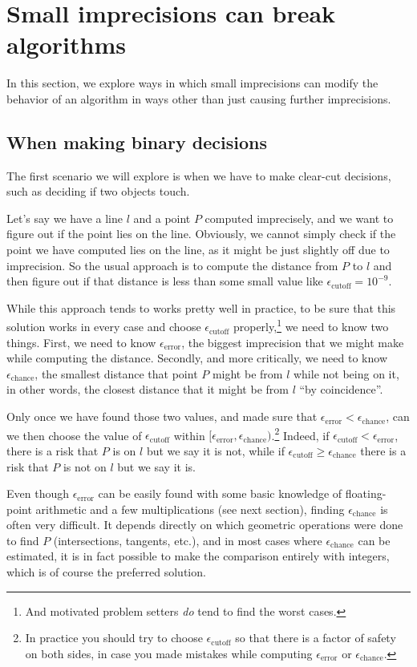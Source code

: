 \section{Small imprecisions can break algorithms}
In this section, we explore ways in which small imprecisions can modify the behavior of an algorithm in ways other than just causing further imprecisions.

\subsection{When making binary decisions}
The first scenario we will explore is when we have to make clear-cut decisions, such as deciding if two objects touch.

{
    \newcommand{\eCutoff}{\epsilon_{\mathrm{cutoff}}}
    \newcommand{\eError}{\epsilon_{\mathrm{error}}}
    \newcommand{\eChance}{\epsilon_{\mathrm{chance}}}
    Let's say we have a line $l$ and a point $P$ computed imprecisely, and we want to figure out if the point lies on the line. Obviously, we cannot simply check if the point we have computed lies on the line, as it might be just slightly off due to imprecision. So the usual approach is to compute the distance from $P$ to $l$ and then figure out if that distance is less than some small value like $\eCutoff=10^{-9}$.

    While this approach tends to works pretty well in practice, to be sure that this solution works in every case and choose $\eCutoff$ properly,\footnote{And motivated problem setters \emph{do} tend to find the worst cases.} we need to know two things. First, we need to know $\eError$, the biggest imprecision that we might make while computing the distance. Secondly, and more critically, we need to know $\eChance$, the smallest distance that point $P$ might be from $l$ while not being on it, in other words, the closest distance that it might be from $l$ ``by coincidence''.

    Only once we have found those two values, and made sure that $\eError < \eChance$, can we then choose the value of $\eCutoff$ within $[\eError,\eChance)$.\footnote{In practice you should try to choose $\eCutoff$ so that there is a factor of safety on both sides, in case you made mistakes while computing $\eError$ or $\eChance$.} Indeed, if $\eCutoff < \eError$, there is a risk that $P$ is on $l$ but we say it is not, while if $\eCutoff \geq \eChance$ there is a risk that $P$ is not on $l$ but we say it is.

    Even though $\eError$ can be easily found with some basic knowledge of floating-point arithmetic and a few multiplications (see next section), finding $\eChance$ is often very difficult. It depends directly on which geometric operations were done to find $P$ (intersections, tangents, etc.), and in most cases where $\eChance$ can be estimated, it is in fact possible to make the comparison entirely with integers, which is of course the preferred solution.
}


